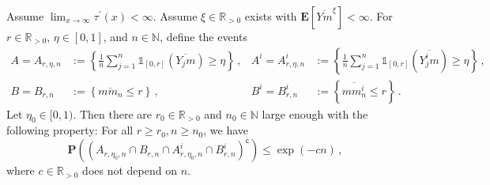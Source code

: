 \documentclass{article}
\newcommand{\N}{\mathbb{N}}
\newcommand{\R}{\mathbb{R}}
\newcommand{\Rpp}{\R_{>0}}
\newcommand{\lcb}{\left\lbrace} %
\newcommand{\rcb}{\right\rbrace} %
\newcommand{\cb}[1]{\lcb #1 \rcb} %
\newcommand{\lb}{\left(} %
\newcommand{\rb}{\right)} %
\newcommand{\br}[1]{\lb #1 \rb} %
\newcommand{\brOf}[1]{\!\br{#1}} %
\renewcommand{\Pr}{\mathbf{P}} %
\newcommand{\PrOf}[1]{\Pr\brOf{#1}}
\newcommand{\E}{\mathbf{E}} %
\newcommand{\Eof}[1]{\E[#1]}
\newcommand{\pr}{^\prime}
\newcommand{\compl}{^\mathsf{c}}%
\newcommand{\ind}{\mathds{1}}%
\newcommand{\eqcm}{\,,} %
\newcommand{\eqfs}{\,.}
\newcommand{\ol}[2]{\overline{#1#2}}
\newcommand{\dtran}{\tau\pr}
\begin{document}
\begin{lemma}\label{lmm:posddrtran:event}
    Assume $\lim_{x\to\infty}\dtran(x) < \infty$.
    Assume $\xi \in \Rpp$ exists with $\Eof{\ol Ym^\xi} < \infty$. 
    For $r\in \Rpp$, $\eta \in [0,1]$, and $n \in \N$, define the events
    \begin{align}
        A = A_{r,\eta,n} &:= \cb{\frac1n \sum_{j=1}^n \ind_{[0, r]}(\ol {Y_j}{m}) \geq \eta}\eqcm
        &
        A^i = A^i_{r,\eta,n} &:= \cb{\frac1n \sum_{j=1}^n \ind_{[0, r]}(\ol {Y_j^i}{m}) \geq \eta}\eqcm
        \\
        B = B_{r,n} &:= \cb{\ol m{m_n} \leq r}\eqcm
        &
        B^i = B^i_{r,n} &:= \cb{\ol m{m_n^i} \leq r}\eqfs
    \end{align}
    Let $\eta_0\in[0,1)$.
    Then there are $r_0\in\Rpp$ and $n_0\in\N$ large enough with the following property:
    For all $r \geq r_0, n\geq n_0$, we have
    \begin{equation}
        \PrOf{(A_{r,\eta_0,n} \cap B_{r,n} \cap A^i_{r,\eta_0,n} \cap B^i_{r,n})\compl} \leq \exp(-cn)
        \eqcm
    \end{equation}
    where $c\in\Rpp$ does not depend on $n$.
\end{lemma}
%
\end{document}
